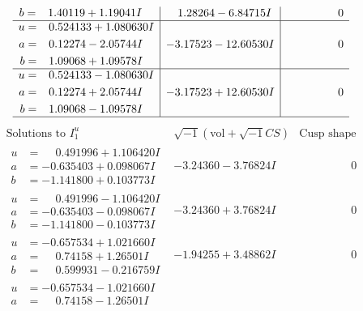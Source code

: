 \documentclass[1p]{elsarticle_modified}
\theoremstyle{definition}
\newcommand{\I}{\sqrt{-1}}
\begin{document}
$$\begin{array}{c|c|c}
\begin{aligned}
b &= \phantom{-}1.40119 + 1.19041 I\end{aligned}
 & \phantom{-}1.28264 - 6.84715 I & \phantom{-0.000000 } 0 \\ \hline\begin{aligned}
u &= \phantom{-}0.524133 + 1.080630 I \\
a &= \phantom{-}0.12274 - 2.05744 I \\
b &= \phantom{-}1.09068 + 1.09578 I\end{aligned}
 & -3.17523 - 12.60530 I & \phantom{-0.000000 } 0 \\ \hline\begin{aligned}
u &= \phantom{-}0.524133 - 1.080630 I \\
a &= \phantom{-}0.12274 + 2.05744 I \\
b &= \phantom{-}1.09068 - 1.09578 I\end{aligned}
 & -3.17523 + 12.60530 I & \phantom{-0.000000 } 0\\
 \hline 
 \end{array}$$\newpage$$\begin{array}{c|c|c}  
\text{Solutions to }I^u_{1}& \I (\text{vol} + \sqrt{-1}CS) & \text{Cusp shape}\\
 \hline 
\begin{aligned}
u &= \phantom{-}0.491996 + 1.106420 I \\
a &= -0.635403 + 0.098067 I \\
b &= -1.141800 + 0.103773 I\end{aligned}
 & -3.24360 - 3.76824 I & \phantom{-0.000000 } 0 \\ \hline\begin{aligned}
u &= \phantom{-}0.491996 - 1.106420 I \\
a &= -0.635403 - 0.098067 I \\
b &= -1.141800 - 0.103773 I\end{aligned}
 & -3.24360 + 3.76824 I & \phantom{-0.000000 } 0 \\ \hline\begin{aligned}
u &= -0.657534 + 1.021660 I \\
a &= \phantom{-}0.74158 + 1.26501 I \\
b &= \phantom{-}0.599931 - 0.216759 I\end{aligned}
 & -1.94255 + 3.48862 I & \phantom{-0.000000 } 0 \\ \hline\begin{aligned}
u &= -0.657534 - 1.021660 I \\
a &= \phantom{-}0.74158 - 1.26501 I \\

\end{aligned}
\end{array}$$
\end{document}
